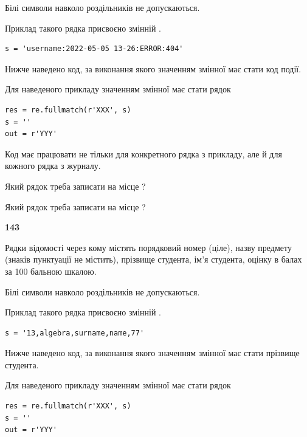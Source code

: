 Білі символи навколо роздільників не допускаються.

Приклад такого рядка присвоєно змінній .



\begin{verbatim}
s = 'username:2022-05-05 13-26:ERROR:404'
\end{verbatim}


Нижче наведено код, за виконання якого значенням змінної  має стати код події.

Для наведеного прикладу значенням змінної  має стати рядок 



\begin{verbatim}
res = re.fullmatch(r'XXX', s)
s = ''
out = r'YYY'
\end{verbatim}


Код має працювати не тільки для конкретного рядка з прикладу, але й для кожного рядка з журналу.




Який рядок треба записати на місце  ?\par
\vspace{5mm}


Який рядок треба записати на місце  ?\par


\newpage

{\begin {center}\textbf{ 143}\end {center}}\par
Рядки відомості через кому містять порядковий номер (ціле), назву предмету (зна\-ків пунктуації не містить), прізвище студента, ім'я студента, оцінку в балах за 100 бальною шкалою.

Білі символи навколо роздільників не допускаються.

Приклад такого рядка присвоєно змінній .



\begin{verbatim}
s = '13,algebra,surname,name,77'
\end{verbatim}


Нижче наведено код, за виконання якого значенням змінної  має стати прізвище студента.

Для наведеного прикладу значенням змінної  має стати рядок 



\begin{verbatim}
res = re.fullmatch(r'XXX', s)
s = ''
out = r'YYY'
\end{verbatim}


